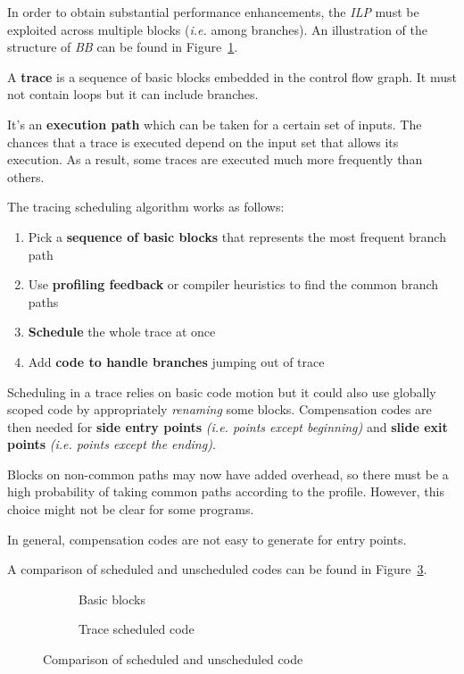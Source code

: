 \documentclass[english]{article}
\begin{document}
In order to obtain substantial performance enhancements, the \textit{ILP} must be exploited across multiple blocks (\textit{i.e.} among branches).
An illustration of the structure of \textit{BB} can be found in Figure~\ref{fig:basic-blocks}.

\bigskip
A \textbf{trace} is a sequence of basic blocks embedded in the control flow graph.
It must not contain loops but it can include branches.

It's an \textbf{execution path} which can be taken for a certain set of inputs.
The chances that a trace is executed depend on the input set that allows its execution.
As a result, some traces are executed much more frequently than others.

The tracing scheduling algorithm works as follows:

\begin{enumerate}
  \item Pick a \textbf{sequence of basic blocks} that represents the most frequent branch path
  \item Use \textbf{profiling feedback} or compiler heuristics to find the common branch paths
  \item \textbf{Schedule} the whole trace at once
  \item Add \textbf{code to handle branches} jumping out of trace
\end{enumerate}

Scheduling in a trace relies on basic code motion but it could also use globally scoped code by appropriately \textit{renaming} some blocks.
Compensation codes are then needed for \textbf{side entry points} \textit{(i.e. points except beginning)} and \textbf{slide exit points} \textit{(i.e. points except the ending)}.

Blocks on non-common paths may now have added overhead, so there must be a high probability of taking common paths according to the profile.
However, this choice might not be clear for some programs.

In general, compensation codes are not easy to generate for entry points.

\bigskip
A comparison of scheduled and unscheduled codes can be found in Figure~\ref{fig:compare-scheduled-unscheduled-code}.

\begin{figure}[htbp]
  \bigskip
  \centering

  \begin{subfigure}[b]{0.495\textwidth}
    \centering
    \caption{Basic blocks}
    \label{fig:basic-blocks}
  \end{subfigure}
  \begin{subfigure}[b]{0.495\textwidth}
    \centering
    \caption{Trace scheduled code}
    \label{fig:trace-scheduled-code}
  \end{subfigure}
  \caption{Comparison of scheduled and unscheduled code}
  \label{fig:compare-scheduled-unscheduled-code}
  \bigskip
\end{figure}
\end{document}
